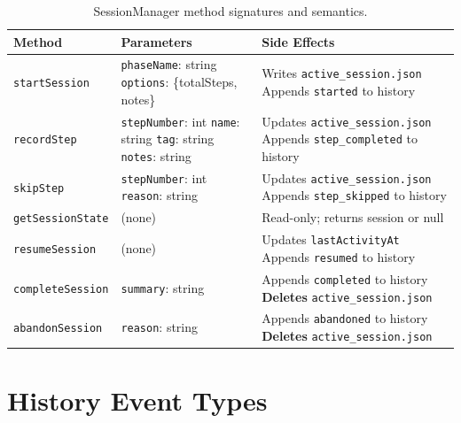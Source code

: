 \documentclass[11pt,letterpaper]{article}
\begin{document}
\begin{table}[h]
\centering
\caption{SessionManager method signatures and semantics.}
\label{tab:api}
\small
\begin{tabular}{@{}lp{4cm}p{5cm}@{}}
\toprule
\textbf{Method} & \textbf{Parameters} & \textbf{Side Effects} \\
\midrule
\texttt{startSession} &
    \texttt{phaseName}: string \newline
    \texttt{options}: \{totalSteps, notes\} &
    Writes \texttt{active\_session.json} \newline
    Appends \texttt{started} to history \\
\midrule
\texttt{recordStep} &
    \texttt{stepNumber}: int \newline
    \texttt{name}: string \newline
    \texttt{tag}: string \newline
    \texttt{notes}: string &
    Updates \texttt{active\_session.json} \newline
    Appends \texttt{step\_completed} to history \\
\midrule
\texttt{skipStep} &
    \texttt{stepNumber}: int \newline
    \texttt{reason}: string &
    Updates \texttt{active\_session.json} \newline
    Appends \texttt{step\_skipped} to history \\
\midrule
\texttt{getSessionState} &
    (none) &
    Read-only; returns session or null \\
\midrule
\texttt{resumeSession} &
    (none) &
    Updates \texttt{lastActivityAt} \newline
    Appends \texttt{resumed} to history \\
\midrule
\texttt{completeSession} &
    \texttt{summary}: string &
    Appends \texttt{completed} to history \newline
    \textbf{Deletes} \texttt{active\_session.json} \\
\midrule
\texttt{abandonSession} &
    \texttt{reason}: string &
    Appends \texttt{abandoned} to history \newline
    \textbf{Deletes} \texttt{active\_session.json} \\
\bottomrule
\end{tabular}
\end{table}

\section{History Event Types}
\label{app:events}
\end{document}
